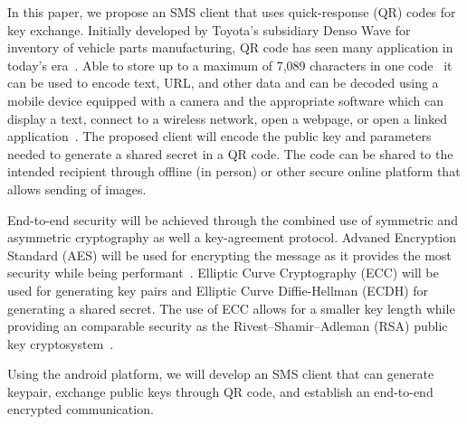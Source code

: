 \documentclass[journal]{./IEEE/IEEEtran}
\begin{document}
In this paper, we propose an SMS client that uses 
quick-response (QR) codes for key exchange. Initially developed by Toyota's
subsidiary Denso Wave for inventory of vehicle parts manufacturing,
QR code has seen many application in today's era~\cite{Tiwari_2016}.
Able to store up to a maximum of 7,089 characters in one code~\cite{qrcode}
it can be used to encode text, URL, and other data and can be decoded using
a mobile device equipped with a camera and the appropriate software which can
display a text, connect to a wireless network, open a webpage, or open a linked
application~\cite{Shin_Jung_Chang_2012}. The proposed client will encode the
public key and parameters needed to generate a shared secret in a QR code. The
code can be shared to the intended recipient through offline (in person)
or other secure online platform that allows sending of images.

End-to-end security will be achieved through the combined use of symmetric and
asymmetric cryptography as well a key-agreement protocol. Advaned Encryption
Standard (AES) will be used for encrypting the message as it provides the
most security while being performant~\cite{Karale_Pendke_Dahiwale_2015}.
Elliptic Curve Cryptography (ECC) will be used for generating key pairs and
Elliptic Curve Diffie-Hellman (ECDH) for generating a shared secret. The use
of ECC allows for a smaller key length while providing an comparable security
as the Rivest–Shamir–Adleman (RSA) public key cryptosystem~\cite{Amara_Siad_2011}.

Using the android platform, we will develop an SMS client that can generate
keypair, exchange public keys through QR code, and establish an end-to-end
encrypted communication. 


\end{document}
